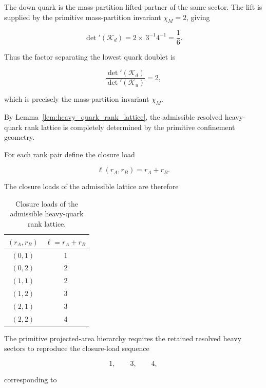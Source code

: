 \documentclass[11pt]{article}
\theoremstyle{definition}
\theoremstyle{remark}
\begin{document}
The down quark is the mass-partition lifted partner of the same
sector. The lift is supplied by the primitive mass-partition
invariant \(\chi_M=2\), giving

\begin{equation}
\det{}'(\mathcal K_d)
=
2 \times \,3^{-1}4^{-1}
=
\frac{1}{6}.
\label{eq:down_quark_geometric_selection}
\end{equation}

Thus the factor separating the lowest quark doublet is

\begin{equation}
\frac{
\det{}'(\mathcal K_d)
}{
\det{}'(\mathcal K_u)
}
=
2,
\end{equation}

which is precisely the mass-partition invariant \(\chi_M\).

By Lemma~\ref{lem:heavy_quark_rank_lattice}, the admissible
resolved heavy-quark rank lattice is completely determined by
the primitive confinement geometry.

For each rank pair define the closure load

\begin{equation}
\ell(r_A,r_B)
=
r_A+r_B.
\label{eq:closure_load_definition}
\end{equation}

The closure loads of the admissible lattice are therefore

\begin{table}[H]
\centering
\caption{Closure loads of the admissible heavy-quark rank lattice.}
\begin{tabular}{cc}
\toprule
$(r_A,r_B)$ & $\ell=r_A+r_B$\\
\midrule
$(0,1)$ & 1\\
$(0,2)$ & 2\\
$(1,1)$ & 2\\
$(1,2)$ & 3\\
$(2,1)$ & 3\\
$(2,2)$ & 4\\
\bottomrule
\end{tabular}
\end{table}

The primitive projected-area hierarchy requires the retained
resolved heavy sectors to reproduce the closure-load sequence

\begin{equation}
1,
\qquad
3,
\qquad
4,
\end{equation}

corresponding to
\end{document}
